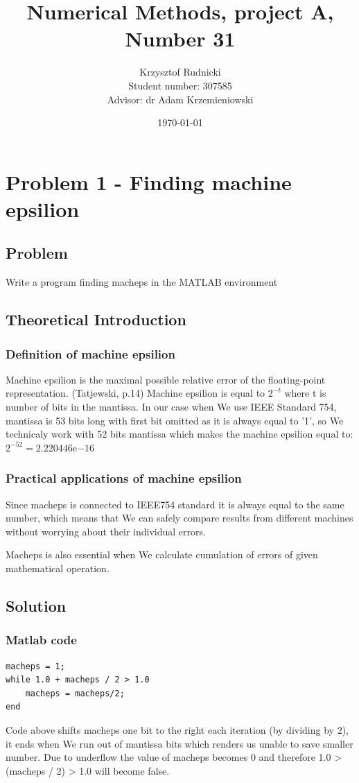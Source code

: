 \documentclass[12pt]{report}
\title{Numerical Methods, project A, Number 31}
\author{Krzysztof Rudnicki\\ Student number: 307585 \\ Advisor: dr Adam Krzemieniowski}
\date{\today}
\begin{document}
\maketitle
\tableofcontents

\chapter{Problem 1 - Finding machine epsilion}

\section{Problem}
Write a program finding macheps in the MATLAB environment
\section{Theoretical Introduction}
\subsection{Definition of machine epsilion}
Machine epsilion is the maximal possible relative error of the floating-point representation. (Tatjewski, p.14)
Machine epsilion is equal to $2^{-t}$ where t is number of bits in the mantissa.
In our case when We use IEEE Standard 754, mantissa is 53 bits long with first bit omitted as it is always equal to '1', so We technicaly work with 52 bits mantissa which makes the machine epsilion equal to: $2^{-52} = 2.220446\mathrm{e}{-16}$

\subsection{Practical applications of machine epsilion}
Since macheps is connected to IEEE754 standard it is always equal to the same number, which means that We can safely compare results from different machines without worrying about their individual errors.

Macheps is also essential when We calculate cumulation of errors of given mathematical operation.

\newpage
\section{Solution}

\subsection{Matlab code}
\begin{lstlisting}
macheps = 1;
while 1.0 + macheps / 2 > 1.0
    macheps = macheps/2;
end
\end{lstlisting}
Code above shifts macheps one bit to the right each iteration (by dividing by 2), it ends when We run out of mantissa bits which renders us unable to save smaller number. Due to underflow the value of macheps becomes 0 and therefore 1.0 > (macheps / 2) > 1.0 will become false.
\end{document}
